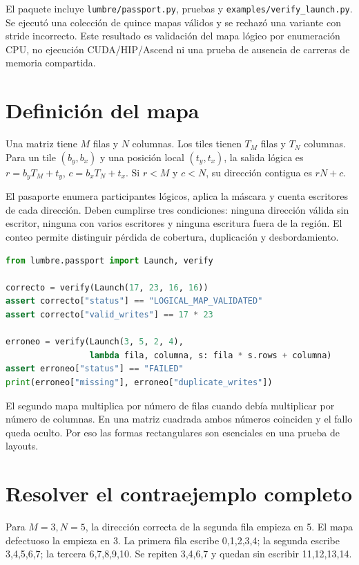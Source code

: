\documentclass[12pt,a4paper,oneside]{report}
\begin{document}
El paquete incluye \texttt{lumbre/passport.py}, pruebas y \texttt{examples/ver\allowbreak{}ify\_launch.p\allowbreak{}y}. Se ejecutó una colección de quince mapas válidos y se rechazó una variante con stride incorrecto. Este resultado es validación del mapa lógico por enumeración CPU, no ejecución CUDA/HIP/Ascend ni una prueba de ausencia de carreras de memoria compartida.

\section{Definición del mapa}
Una matriz tiene $M$ filas y $N$ columnas. Los tiles tienen $T_M$ filas y $T_N$ columnas. Para un tile $(b_y,b_x)$ y una posición local $(t_y,t_x)$, la salida lógica es $r=b_yT_M+t_y$, $c=b_xT_N+t_x$. Si $r<M$ y $c<N$, su dirección contigua es $rN+c$.

El pasaporte enumera participantes lógicos, aplica la máscara y cuenta escritores de cada dirección. Deben cumplirse tres condiciones: ninguna dirección válida sin escritor, ninguna con varios escritores y ninguna escritura fuera de la región. El conteo permite distinguir pérdida de cobertura, duplicación y desbordamiento.

\begin{lstlisting}[language=Python]
from lumbre.passport import Launch, verify

correcto = verify(Launch(17, 23, 16, 16))
assert correcto["status"] == "LOGICAL_MAP_VALIDATED"
assert correcto["valid_writes"] == 17 * 23

erroneo = verify(Launch(3, 5, 2, 4),
                 lambda fila, columna, s: fila * s.rows + columna)
assert erroneo["status"] == "FAILED"
print(erroneo["missing"], erroneo["duplicate_writes"])
\end{lstlisting}
El segundo mapa multiplica por número de filas cuando debía multiplicar por número de columnas. En una matriz cuadrada ambos números coinciden y el fallo queda oculto. Por eso las formas rectangulares son esenciales en una prueba de layouts.

\section{Resolver el contraejemplo completo}
Para $M=3,N=5$, la dirección correcta de la segunda fila empieza en 5. El mapa defectuoso la empieza en 3. La primera fila escribe 0,1,2,3,4; la segunda escribe 3,4,5,6,7; la tercera 6,7,8,9,10. Se repiten 3,4,6,7 y quedan sin escribir 11,12,13,14.
\end{document}
